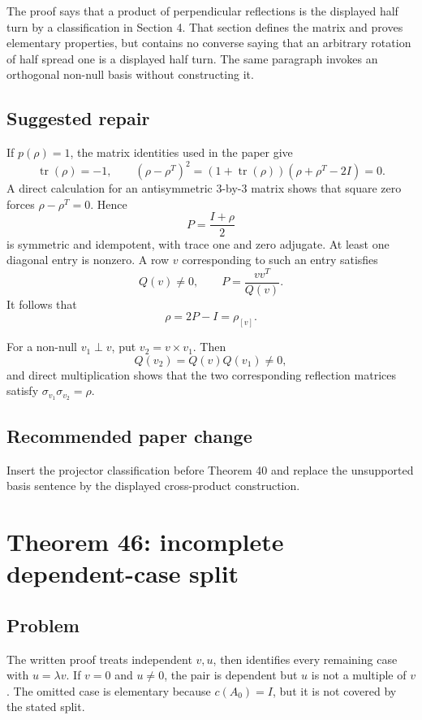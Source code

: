 \documentclass[11pt]{article}
\newcommand{\tr}{\operatorname{tr}}
\begin{document}
The proof says that a product of perpendicular reflections is the displayed
half turn by a classification in Section 4.  That section defines the matrix
and proves elementary properties, but contains no converse saying that an
arbitrary rotation of half spread one is a displayed half turn.  The same
paragraph invokes an orthogonal non-null basis without constructing it.

\subsection{Suggested repair}

If \(p(\rho)=1\), the matrix identities used in the paper give
\[
 \tr(\rho)=-1,\qquad
 (\rho-\rho^T)^2=(1+\tr(\rho))(\rho+\rho^T-2I)=0.
\]
A direct calculation for an antisymmetric \(3\)-by-\(3\) matrix shows that
square zero forces \(\rho-\rho^T=0\).  Hence
\[
 P=\frac{I+\rho}{2}
\]
is symmetric and idempotent, with trace one and zero adjugate.  At least one
diagonal entry is nonzero.  A row \(v\) corresponding to such an entry
satisfies
\[
 Q(v)\ne0,\qquad P=\frac{vv^T}{Q(v)}.
\]
It follows that
\[
 \rho=2P-I=\rho_{[v]}.
\]

For a non-null \(v_1\perp v\), put \(v_2=v\times v_1\).  Then
\[
 Q(v_2)=Q(v)Q(v_1)\ne0,
\]
and direct multiplication shows that the two corresponding reflection
matrices satisfy \(\sigma_{v_1}\sigma_{v_2}=\rho\).

\subsection{Recommended paper change}

Insert the projector classification before Theorem 40 and replace the
unsupported basis sentence by the displayed cross-product construction.

\section{Theorem 46: incomplete dependent-case split}

\subsection{Problem}

The written proof treats independent \(v,u\), then identifies every remaining
case with \(u=\lambda v\).  If \(v=0\) and \(u\ne0\), the pair is dependent
but \(u\) is not a multiple of \(v\).  The omitted case is elementary because
\(c(A_0)=I\), but it is not covered by the stated split.
\end{document}
